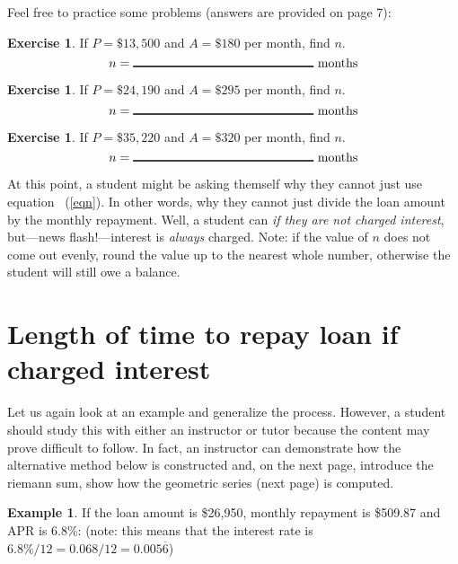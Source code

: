 \documentclass[12pt,letterpaper]{amsart}
\theoremstyle{definition} %
\newtheorem{example}[theorem]{Example}
\newtheorem{xca}[theorem]{Exercise}
\begin{document}
\par Feel free to practice some problems (answers are provided on page 7):

\begin{xca}\label{ex1}If $P=\$13,500$ and $A=\$180$ per month, find $n$.
$$n=\mathrm{\rule{2in}{1pt}\ months}$$\end{xca} %

\begin{xca}\label{ex2}If $P=\$24,190$ and $A=\$295$ per month, find $n$.
$$n=\mathrm{\rule{2in}{1pt}\ months}$$\end{xca}

\begin{xca}\label{ex3}If $P=\$35,220$ and $A=\$320$ per month, find $n$.
$$n=\mathrm{\rule{2in}{1pt}\ months}$$\end{xca}

\par At this point, a student might be asking themself why they cannot just use equation ~(\ref{eqn}). In other words, why they cannot just divide the loan amount by the monthly repayment. Well, a student can \textit{if they are not charged interest}, but---news flash!---interest is \textit{always} charged. Note: if the value of $n$ does not come out evenly, round the value up to the nearest whole number, otherwise the student will still owe a balance. %

\vfill
\pagebreak

\section{Length of time to repay loan if charged interest}
Let us again look at an example and generalize the process. However, a student should study this with either an instructor or tutor because the content may prove difficult to follow. In fact, an instructor can demonstrate how the alternative method below is constructed and, on the next page, introduce the riemann sum, show how the geometric series (next page) is computed.

\begin{example}\label{exr}If the loan amount is \$26,950, monthly repayment is \$509.87 and APR is 6.8\%: (note: this means that the interest rate is $6.8\%/12=0.068/12=0.005\overline{6}$)\end{example}
\end{document}
